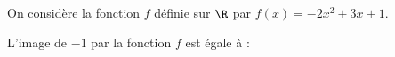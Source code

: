 
On considère la fonction $f$ définie sur $\R$ par $f(x)=-2 x^{2}+3 x+1$.

L'image de $-1$ par la fonction $f$ est égale à :

\smallskip

